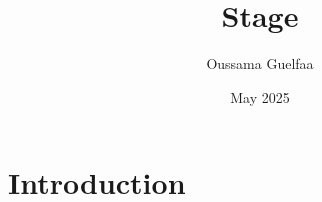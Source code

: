 \documentclass{article}
\title{Stage}
\author{Oussama Guelfaa}
\date{May 2025}
\begin{document}
\maketitle

\section{Introduction}
\end{document}
